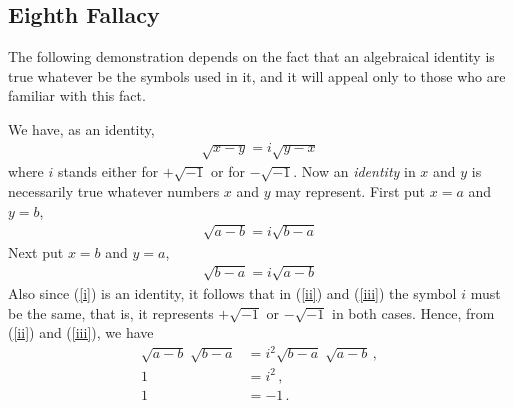 \documentclass[paper=a4, fontsize=12pt]{scrartcl} %
\theoremstyle{definition}
\theoremstyle{remark}
\begin{document}
\subsection*{\textbf{Eighth Fallacy}}  The following demonstration depends on
the fact that an algebraical identity is true whatever be the
symbols used in it, and it will appeal only to those who are
familiar with this fact.

We have, as an identity,
\begin{align}\label{i}
  \sqrt{x-y} = i \sqrt{y-x}
\end{align}
where $i$ stands either for $+ \sqrt{-1}$ or for $- \sqrt{-1}$. Now an
\emph{identity} in $x$ and $y$ is necessarily true whatever numbers $x$
and $y$ may represent. First put $x = a$ and $y = b$,
\begin{align}\label{ii}
    \sqrt{a - b} = i \sqrt{b - a}
\end{align}
 Next put $x = b$ and $y = a$,
\begin{align}\label{iii}
    \sqrt{b - a} = i \sqrt{a - b}
\end{align}
Also since (\ref{i}) is an identity, it follows that in
(\ref{ii}) and (\ref{iii}) the symbol $i$ must be the same, that
is, it represents $+ \sqrt{-1}$ or $- \sqrt{-1}$ in both cases. Hence,
from (\ref{ii}) and (\ref{iii}), we have
\begin{align*}
 \sqrt{a-b}\; \sqrt{b - a} & =  i^2 \sqrt{b-a}\; \sqrt{a - b}\,, \\
    1 & =  i^2\,, \\
 1 &= -1 \, .
\end{align*}


\end{document}
